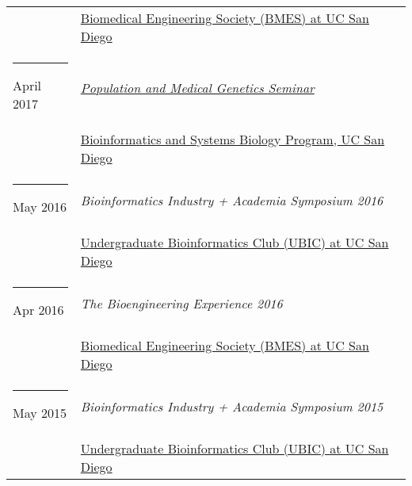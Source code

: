 \documentclass[margin,line]{res}
\begin{document}
\begin{resume}
\begin{longtable}{@{}p{0.7in}p{4in}}
\hspace*{-4mm} & \hspace{4mm} \href{http://bmes.ucsd.edu/}{Biomedical Engineering Society (BMES) at UC San Diego}\\
\hspace*{-4mm} \rule{-1mm}{5mm} April 2017 & \href{https://gymreklab.github.io/teaching/medpopgen_seminar.html}{\textit{Population and Medical Genetics Seminar}}\\*
\hspace*{-4mm} & \hspace{4mm} \href{http://ubicucsd.github.io/}{Bioinformatics and Systems Biology Program, UC San Diego}\\
\hspace*{-4mm} \rule{-1mm}{5mm} May 2016 & \textit{Bioinformatics Industry + Academia Symposium 2016}\\*
\hspace*{-4mm} & \hspace{4mm} \href{http://ubicucsd.github.io/}{Undergraduate Bioinformatics Club (UBIC) at UC San Diego}\\
\hspace*{-4mm} \rule{-1mm}{5mm} Apr 2016 & \textit{The Bioengineering Experience 2016}\\*
\hspace*{-4mm} & \hspace{4mm} \href{http://bmes.ucsd.edu/}{Biomedical Engineering Society (BMES) at UC San Diego}\\
\hspace*{-4mm} \rule{-1mm}{5mm} May 2015 & \textit{Bioinformatics Industry + Academia Symposium 2015}\\*
\hspace*{-4mm} & \hspace{4mm} \href{http://ubicucsd.github.io/}{Undergraduate Bioinformatics Club (UBIC) at UC San Diego}\\
\end{longtable}


\end{resume}
\end{document}
